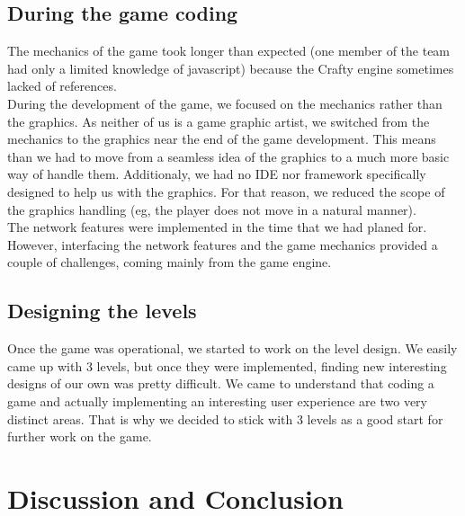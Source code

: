 \documentclass{chi-ext}
\begin{document}
\subsection{During the game coding}
The mechanics of the game took longer than expected (one member of the team had only a limited knowledge of javascript) because the Crafty engine sometimes lacked of references.\\
During the development of the game, we focused on the mechanics rather than the graphics. As neither of us is a game graphic artist, we switched from the mechanics to the graphics near the end of the game development. This means than we had to move from a seamless idea of the graphics to a much more basic way of handle them. Additionaly, we had no IDE nor framework specifically designed to help us with the graphics. For that reason, we reduced the scope of the graphics handling (eg, the player does not move in a natural manner).\\
The network features were implemented in the time that we had planed for. However, interfacing the network features and the game mechanics provided a couple of challenges, coming mainly from the game engine.

\subsection{Designing the levels}
Once the game was operational, we started to work on the level design. We easily came up with 3 levels, but once they were implemented, finding new interesting designs of our own was pretty difficult. We came to understand that coding a game and actually implementing an interesting user experience are two very distinct areas. That is why we decided to stick with 3 levels as a good start for further work on the game.

\section{Discussion and Conclusion}

\balance


\end{document}
